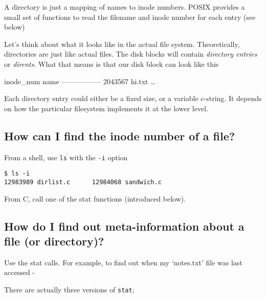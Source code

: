 A directory is just a mapping of names to inode numbers. POSIX provides
a small set of functions to read the filename and inode number for each
entry (see below)

Let's think about what it looks like in the actual file system.
Theoretically, directories are just like actual files. The disk blocks
will contain \emph{directory entries} or \emph{dirents}. What that means
is that our disk block can look like this

\textbar{} inode\_num \textbar{} name \textbar{}
\textbar{}-----------\textbar{}------\textbar{} \textbar{} 2043567
\textbar{} hi.txt \textbar{} \ldots{}

Each directory entry could either be a fixed size, or a variable
c-string. It depends on how the particular filesystem implements it at
the lower level.

\subsection{How can I find the inode number of a
file?}\label{how-can-i-find-the-inode-number-of-a-file}

From a shell, use \texttt{ls} with the \texttt{-i} option

\begin{verbatim}
$ ls -i
12983989 dirlist.c      12984068 sandwich.c
\end{verbatim}

From C, call one of the stat functions (introduced below).

\subsection{How do I find out meta-information about a file (or
directory)?}\label{how-do-i-find-out-meta-information-about-a-file-or-directory}

Use the stat calls. For example, to find out when my `notes.txt' file
was last accessed -

\begin{Shaded}
\end{Shaded}

There are actually three versions of \texttt{stat};


